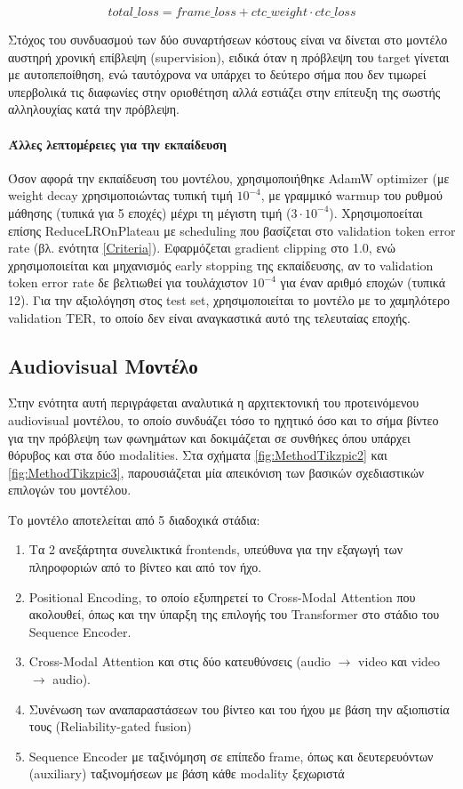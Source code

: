 \[
total\_loss = frame\_loss + ctc\_weight \cdot ctc\_loss
\]

Στόχος του συνδυασμού των δύο συναρτήσεων κόστους είναι να δίνεται στο μοντέλο αυστηρή χρονική επίβλεψη (supervision), ειδικά όταν η πρόβλεψη του target γίνεται με αυτοπεποίθηση, ενώ ταυτόχρονα να υπάρχει το δεύτερο σήμα που δεν τιμωρεί υπερβολικά τις διαφωνίες στην οριοθέτηση αλλά εστιάζει στην επίτευξη της σωστής αλληλουχίας κατά την πρόβλεψη.

\paragraph{Άλλες λεπτομέρειες για την εκπαίδευση}

Όσον αφορά την εκπαίδευση του μοντέλου, χρησιμοποιήθηκε AdamW optimizer (με weight decay χρησιμοποιώντας τυπική τιμή $10^{-4}$, με γραμμικό warmup του ρυθμού μάθησης (τυπικά για 5 εποχές) μέχρι τη μέγιστη τιμή ($3\cdot10^{-4}$). Χρησιμοποείται επίσης ReduceLROnPlateau με scheduling που βασίζεται στο validation token error rate (βλ. ενότητα \ref{Criteria}). Εφαρμόζεται gradient clipping στο 1.0, ενώ χρησιμοποιείται και μηχανισμός early stopping της εκπαίδευσης, αν το validation token error rate δε βελτιωθεί για τουλάχιστον $10^{-4}$ για έναν αριθμό εποχών (τυπικά 12). Για την αξιολόγηση στος test set, χρησιμοποιείται το μοντέλο με το χαμηλότερο validation TER, το οποίο δεν είναι αναγκαστικά αυτό της τελευταίας εποχής.

\subsection{Audiovisual Μοντέλο}
\label{AudiovisualModel}
Στην ενότητα αυτή περιγράφεται αναλυτικά η αρχιτεκτονική του προτεινόμενου audiovisual μοντέλου, το οποίο συνδυάζει τόσο το ηχητικό όσο και το σήμα βίντεο για την πρόβλεψη των φωνημάτων και δοκιμάζεται σε συνθήκες όπου υπάρχει θόρυβος και στα δύο modalities. Στα σχήματα \ref{fig:MethodTikzpic2} και \ref{fig:MethodTikzpic3}, παρουσιάζεται μία απεικόνιση των βασικών σχεδιαστικών επιλογών του μοντέλου.

Το μοντέλο αποτελείται από 5 διαδοχικά στάδια:
\begin{enumerate}
\item Τα 2 ανεξάρτητα συνελικτικά frontends, υπεύθυνα για την εξαγωγή των πληροφοριών από το βίντεο και από τον ήχο.
\item Positional Encoding, το οποίο εξυπηρετεί το Cross-Modal Attention που ακολουθεί, όπως και την ύπαρξη της επιλογής του Transformer στο στάδιο του Sequence Encoder.
\item Cross-Modal Attention και στις δύο κατευθύνσεις (audio $\rightarrow$ video και video $\rightarrow$ audio).
\item Συνένωση των αναπαραστάσεων του βίντεο και του ήχου με βάση την αξιοπιστία τους (Reliability-gated fusion)
\item Sequence Encoder με ταξινόμηση σε επίπεδο frame, όπως και δευτερευόντων (auxiliary) ταξινομήσεων με βάση κάθε modality ξεχωριστά
\end{enumerate}

